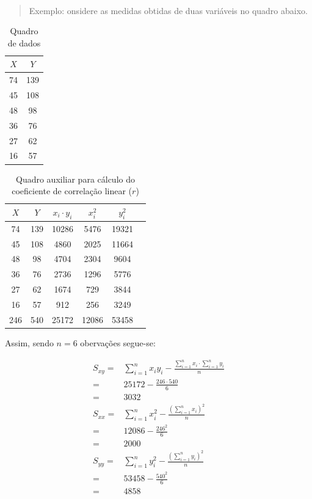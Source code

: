 \documentclass[
]{book}
\begin{document}
~

\begin{quote}
Exemplo: onsidere as medidas obtidas de duas variáveis no quadro abaixo.
\end{quote}

\hfill\break

\begin{table}[h]
\centering
\caption{Quadro de dados}
\begin{tabular}{|c|c|}
    \hline 
    $X$ & $Y$ \\ 
    \hline 
      74 & 139 \\ 
    \hline 
     45 & 108 \\ 
    \hline 
     48 & 98 \\ 
    \hline 
     36 & 76 \\ 
    \hline 
     27 & 62 \\ 
    \hline 
     16 & 57 \\ 
    \hline 
\end{tabular} 
\end{table}

\hfill\break

\begin{table}[h]
\centering
\caption{Quadro auxiliar para cálculo do coeficiente de correlação linear ($r$)}
\begin{tabular}{|c|c|c|c|c|c|}
\hline 
  $X$ & $Y$ & $x_{i} \cdot y_{i}$ & $ x_{i}^2$ & $y_{i}^2$ \\ 
\hline 
 74 & 139 & 10286 & 5476 & 19321 \\ 
\hline 
 45 & 108 & 4860 & 2025 & 11664 \\ 
\hline 
 48 & 98 & 4704 & 2304 & 9604 \\ 
\hline 
 36 & 76 & 2736 & 1296 & 5776 \\ 
\hline 
  27 & 62 & 1674 & 729 & 3844 \\ 
\hline 
  16 & 57 & 912 & 256 & 3249 \\ 
\hline 
  246 & 540 & 25172 & 12086 & 53458 \\ 
\hline 
\end{tabular} 
\end{table}

\hfill\break

\hfill\break

Assim, sendo \(n=6\) obervações segue-se:

\hfill\break

\begin{align*}
S_{xy} = & \sum_{i=1}^{n} x_{i}y_{i} - \frac{\sum_{i=1}^{n}x_{i}\cdot\sum_{i=1}^{n}y_{i}}{n} \\
       = & 25172 - \frac{246 \cdot 540}{6} \\
       = & 3032 \\
S_{xx} = & \sum_{i=1}^{n} x_{i}^{2} - \frac{(\sum_{i=1}^{n} x_{i})^{2}}{n} \\
       = & 12086 - \frac{246^2}{6} \\
       = & 2000 \\
S_{yy} = & \sum_{i=1}^{n}y_{i}^{2} - \frac{(\sum_{i=1}^{n} y_{i})^{2}}{n} \\
       = & 53458 - \frac{540^2}{6} \\
       = & 4858
\end{align*}
\end{document}
